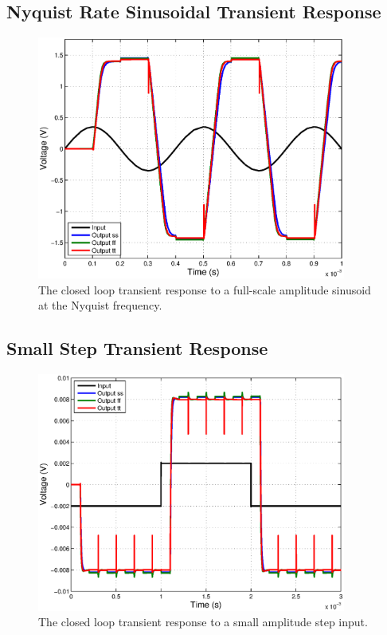 \documentclass[journal]{IEEEtran}
\begin{document}
\subsection{Nyquist Rate Sinusoidal Transient Response}

\begin{figure}
\centering
\includegraphics[width=4in]{Plots/closed_sine.eps}
\caption{The closed loop transient response to a full-scale amplitude sinusoid at the Nyquist frequency.}
\label{fig:closed_sine}
\end{figure}


\subsection{Small Step Transient Response}
\begin{figure}
\centering
\includegraphics[width=4in]{Plots/closed_small_step.eps}
\caption{The closed loop transient response to a small amplitude step input.}
\label{fig:closed_small_step}
\end{figure}
\end{document}
